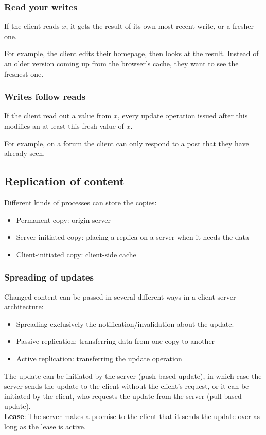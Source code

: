 \documentclass[margin=0px]{article}
\begin{document}
\subsubsection{Read your writes}

If the client reads $x$, it gets the result of its own most recent write, or a fresher one.

For example, the client edits their homepage, then looks at the result. Instead of an older version coming up from the browser's cache,
they want to see the freshest one.

\subsubsection{Writes follow reads}

If the client read out a value from $x$, every update operation issued after this modifies an at least
this fresh value of $x$.

For example, on a forum the client can only respond to a post that they have already seen.

\subsection{Replication of content}

Different kinds of processes can store the copies:

\begin{itemize}
    \item	Permanent copy: origin server
    \item	Server-initiated copy: placing a replica on a server when it needs
          the data
    \item	Client-initiated copy: client-side cache
\end{itemize}

\subsubsection{Spreading of updates}
Changed content can be passed in several different ways in a client-server architecture:

\begin{itemize}
    \item	Spreading exclusively the notification/invalidation about the update.
    \item	Passive replication: transferring data from one copy to another
    \item	Active replication: transferring the update operation
\end{itemize}

The update can be initiated by the server (push-based update), in which case the server sends the update to the client without the client's request,
or it can be initiated by the client, who requests the update from the server (pull-based update).\\

\noindent \textbf{Lease}: The server makes a promise to the client that it sends the update over as long as the lease is active.
\end{document}
